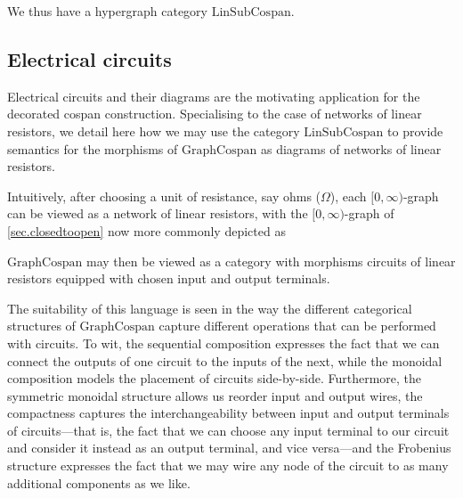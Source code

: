 We thus have a hypergraph category $\mathrm{LinSubCospan}$.

\subsection{Electrical circuits} \label{ssec.exelectricalcircuits}
Electrical circuits and their diagrams are the motivating application for the
decorated cospan construction. Specialising to the case of networks of linear
resistors, we detail here how we may use the category $\mathrm{LinSubCospan}$ to
provide semantics for the morphisms of $\mathrm{GraphCospan}$ as diagrams of
networks of linear resistors.

Intuitively, after choosing a unit of resistance, say ohms ($\Omega$), each
$[0,\infty)$-graph can be viewed as a network of linear resistors, with the
$[0,\infty)$-graph of \textsection\ref{sec.closedtoopen} now more commonly
depicted as
\begin{center}
\end{center}
$\mathrm{GraphCospan}$ may then be viewed as a category with morphisms
circuits of linear resistors equipped with chosen input and output terminals.

The suitability of this language is seen in the way the different categorical
structures of $\mathrm{GraphCospan}$ capture different operations that can be
performed with circuits. To wit, the sequential composition expresses the fact
that we can connect the outputs of one circuit to the inputs of the next, while
the monoidal composition models the placement of circuits side-by-side.
Furthermore, the symmetric monoidal structure allows us reorder input and output
wires, the compactness captures the interchangeability between input and
output terminals of circuits---that is, the fact that we can choose any input
terminal to our circuit and consider it instead as an output terminal, and vice
versa---and the Frobenius structure expresses the fact that we may wire any
node of the circuit to as many additional components as we like.

